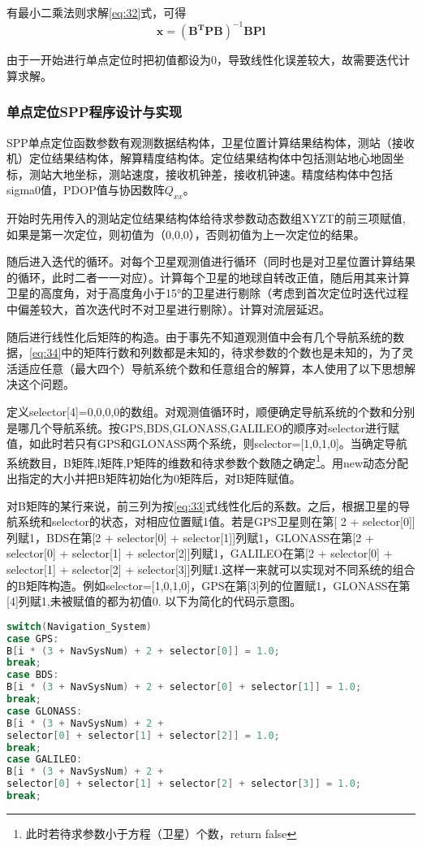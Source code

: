 \documentclass{ctexart}
\begin{document}
有最小二乘法则求解\eqref{eq:32}式，可得
\begin{equation}
\mathbf{x}=(\mathbf{B^T}\mathbf{P}\mathbf{B})^{-1}\mathbf{B}\mathbf{P}\mathbf{l}
\end{equation}

由于一开始进行单点定位时把初值都设为0，导致线性化误差较大，故需要迭代计算求解。

\subsubsection{单点定位SPP程序设计与实现}
SPP单点定位函数参数有观测数据结构体，卫星位置计算结果结构体，测站（接收机）定位结果结构体，解算精度结构体。定位结果结构体中包括测站地心地固坐标，测站大地坐标，测站速度，接收机钟差，接收机钟速。精度结构体中包括sigma0值，PDOP值与协因数阵$Q_{xx}$。

开始时先用传入的测站定位结果结构体给待求参数动态数组XYZT的前三项赋值,如果是第一次定位，则初值为（0,0,0），否则初值为上一次定位的结果。

随后进入迭代的循环。对每个卫星观测值进行循环（同时也是对卫星位置计算结果的循环，此时二者一一对应）。计算每个卫星的地球自转改正值，随后用其来计算卫星的高度角，对于高度角小于15°的卫星进行剔除（考虑到首次定位时迭代过程中偏差较大，首次迭代时不对卫星进行剔除）。计算对流层延迟。

随后进行线性化后矩阵的构造。由于事先不知道观测值中会有几个导航系统的数据，\eqref{eq:34}中的矩阵行数和列数都是未知的，待求参数的个数也是未知的，为了灵活适应任意（最大四个）导航系统个数和任意组合的解算，本人使用了以下思想解决这个问题。

定义selector[4]={0,0,0,0}的数组。对观测值循环时，顺便确定导航系统的个数和分别是哪几个导航系统。按GPS,BDS,GLONASS,GALILEO的顺序对selector进行赋值，如此时若只有GPS和GLONASS两个系统，则selector=[1,0,1,0]。当确定导航系统数目，B矩阵,l矩阵,P矩阵的维数和待求参数个数随之确定\footnote{此时若待求参数小于方程（卫星）个数，return false}。用new动态分配出指定的大小并把B矩阵初始化为0矩阵后，对B矩阵赋值。

对B矩阵的某行来说，前三列为按\eqref{eq:33}式线性化后的系数。之后，根据卫星的导航系统和selector的状态，对相应位置赋1值。若是GPS卫星则在第[ 2 + selector[0]]列赋1，BDS在第[2 + selector[0] + selector[1]]列赋1，GLONASS在第[2 + selector[0] + selector[1] + selector[2]]列赋1，GALILEO在第[2 + selector[0] + selector[1] + selector[2] + selector[3]]列赋1.这样一来就可以实现对不同系统的组合的B矩阵构造。例如selector=[1,0,1,0]，GPS在第[3]列的位置赋1，GLONASS在第[4]列赋1,未被赋值的都为初值0.
以下为简化的代码示意图。
\begin{lstlisting}[language=C]
switch(Navigation_System)
case GPS:
B[i * (3 + NavSysNum) + 2 + selector[0]] = 1.0;
break;
case BDS:
B[i * (3 + NavSysNum) + 2 + selector[0] + selector[1]] = 1.0;
break;
case GLONASS:
B[i * (3 + NavSysNum) + 2 + 
selector[0] + selector[1] + selector[2]] = 1.0;
break;
case GALILEO:
B[i * (3 + NavSysNum) + 2 + 
selector[0] + selector[1] + selector[2] + selector[3]] = 1.0;
break;
\end{lstlisting}
\end{document}
